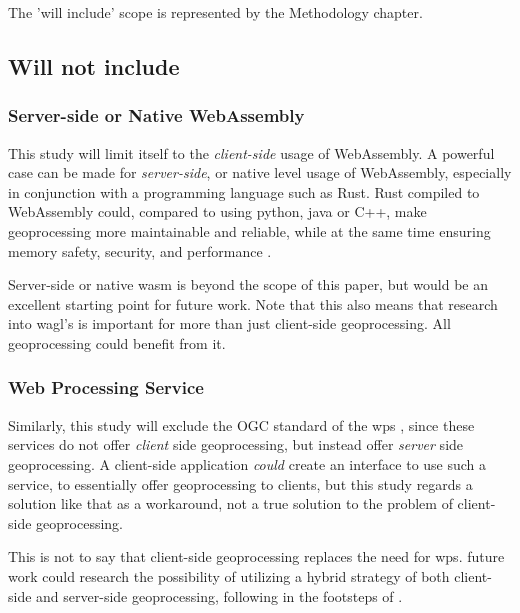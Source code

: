 The 'will include' scope is represented by the Methodology chapter. 

\subsection*{Will not include}

\subsubsection*{Server-side or Native WebAssembly} %

This study will limit itself to the \emph{client-side} usage of WebAssembly. 
A powerful case can be made for \emph{server-side}, or native level usage of WebAssembly, especially in conjunction with a programming language such as Rust. 
Rust compiled to WebAssembly could, compared to using python, java or C++, make geoprocessing more maintainable and reliable, while at the same time ensuring memory safety, security, and performance \cite{clack_standardizing_2019}. 

Server-side or native wasm is beyond the scope of this paper, but would be an excellent starting point for future work. Note that this also means that research into \ac{wagl}'s is important for more than just client-side geoprocessing. All geoprocessing could benefit from it.



\subsubsection*{Web Processing Service} %

Similarly, this study will exclude the OGC standard of the \ac{wps} \cite{ogc_web_2015}, since these services do not offer \emph{client} side geoprocessing, but instead offer \emph{server} side geoprocessing. A client-side application \textit{could} create an interface to use such a service, to essentially offer geoprocessing to clients, but this study regards a solution like that as a workaround, not a true solution to the problem of client-side geoprocessing. 

This is not to say that client-side geoprocessing replaces the need for \ac{wps}. 
future work could research the possibility of utilizing a hybrid strategy of both client-side and server-side geoprocessing, following in the footsteps of \cite{panidi_hybrid_2015}. 

